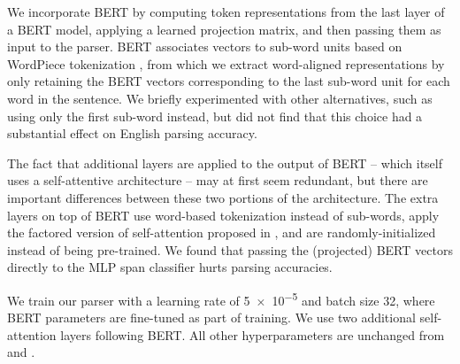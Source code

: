 \documentclass[11pt,a4paper]{article}
\begin{document}
We incorporate BERT by computing token representations from the last layer of a BERT model, applying a learned projection matrix, and then passing them as input to the parser.
BERT associates vectors to sub-word units based on WordPiece tokenization \citep{wu_googles_2016}, from which we extract word-aligned representations by only retaining the BERT vectors corresponding to the last sub-word unit for each word in the sentence.
We briefly experimented with other alternatives, such as using only the first sub-word instead, but did not find that this choice had a substantial effect on English parsing accuracy.

The fact that additional layers are applied to the output of BERT -- which itself uses a self-attentive architecture -- may at first seem redundant, but there are important differences between these two portions of the architecture. The extra layers on top of BERT use word-based tokenization instead of sub-words, apply the factored version of self-attention proposed in \citet{kitaev_2018_self_attentive}, and are randomly-initialized instead of being pre-trained. We found that passing the (projected) BERT vectors directly to the MLP span classifier hurts parsing accuracies.

We train our parser with a learning rate of \num{5e-5} and batch size 32, where BERT parameters are fine-tuned as part of training. We use two additional self-attention layers following BERT. All other hyperparameters are unchanged from \citet{kitaev_2018_self_attentive} and \citet{devlin_bert:2018}.
\end{document}

